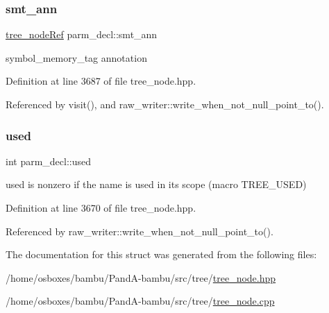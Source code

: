 \mbox{\label{structparm__decl_a251bf25da86d8d0ca169e527a2e02e9b}} 
\subsubsection{\texorpdfstring{smt\+\_\+ann}{smt\_ann}}
{\footnotesize\ttfamily \hyperlink{tree__node_8hpp_a6ee377554d1c4871ad66a337eaa67fd5}{tree\+\_\+node\+Ref} parm\+\_\+decl\+::smt\+\_\+ann}



symbol\+\_\+memory\+\_\+tag annotation 



Definition at line 3687 of file tree\+\_\+node.\+hpp.



Referenced by visit(), and raw\+\_\+writer\+::write\+\_\+when\+\_\+not\+\_\+null\+\_\+point\+\_\+to().

\mbox{\label{structparm__decl_a7b57ed0e055eafc34e895f3d4375316f}} 
\subsubsection{\texorpdfstring{used}{used}}
{\footnotesize\ttfamily int parm\+\_\+decl\+::used}



used is nonzero if the name is used in its scope (macro T\+R\+E\+E\+\_\+\+U\+S\+ED) 



Definition at line 3670 of file tree\+\_\+node.\+hpp.



Referenced by raw\+\_\+writer\+::write\+\_\+when\+\_\+not\+\_\+null\+\_\+point\+\_\+to().



The documentation for this struct was generated from the following files\+:\begin{DoxyCompactItemize}
\item 
/home/osboxes/bambu/\+Pand\+A-\/bambu/src/tree/\hyperlink{tree__node_8hpp}{tree\+\_\+node.\+hpp}\item 
/home/osboxes/bambu/\+Pand\+A-\/bambu/src/tree/\hyperlink{tree__node_8cpp}{tree\+\_\+node.\+cpp}\end{DoxyCompactItemize}
